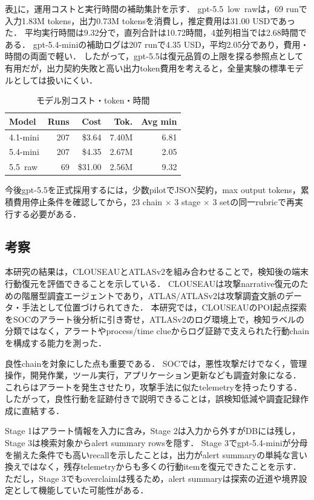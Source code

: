 \documentclass[dvipdfmx]{FITpaper}
\newcommand{\model}[1]{\mbox{\textrm{#1}}}
\begin{document}
表\ref{table:cost}に，運用コストと実行時間の補助集計を示す．
\model{gpt-5.5 low raw}は，69 runで入力1.83M tokens，出力0.73M tokensを消費し，推定費用は31.00 USDであった．
平均実行時間は9.32分で，直列合計は10.72時間，4並列相当では2.68時間である．
\model{gpt-5.4-mini}の補助ログは207 runで4.35 USD，平均2.05分であり，費用・時間の両面で軽い．
したがって，\model{gpt-5.5}は復元品質の上限を探る参照点として有用だが，出力契約失敗と高い出力token費用を考えると，全量実験の標準モデルとしては扱いにくい．

\begin{table}[ht]
    \centering
    \caption{モデル別コスト・token・時間}
    \label{table:cost}
    \begin{tabular}{lrrrr}
        \toprule
        Model & Runs & Cost & Tok. & Avg min \\
        \midrule
        \model{4.1-mini} & 207 & \$3.64 & 7.40M & 6.81 \\
        \model{5.4-mini} & 207 & \$4.35 & 2.67M & 2.05 \\
        \model{5.5 raw} & 69 & \$31.00 & 2.56M & 9.32 \\
        \bottomrule
    \end{tabular}
\end{table}

今後\model{gpt-5.5}を正式採用するには，少数pilotでJSON契約，max output tokens，累積費用停止条件を確認してから，23 chain $\times$ 3 stage $\times$ 3 setの同一rubricで再実行する必要がある．

\subsection{考察}

本研究の結果は，CLOUSEAUとATLASv2を組み合わせることで，検知後の端末行動復元を評価できることを示している．
CLOUSEAUは攻撃narrative復元のための階層型調査エージェントであり，ATLAS/ATLASv2は攻撃調査文脈のデータ・手法として位置づけられてきた．
本研究では，CLOUSEAUのPOI起点探索をSOCのアラート後分析に引き寄せ，ATLASv2のログ環境上で，検知ラベルの分類ではなく，アラートやprocess/time clueからログ証跡で支えられた行動chainを構成する能力を測った．

良性chainを対象にした点も重要である．
SOCでは，悪性攻撃だけでなく，管理操作，開発作業，ツール実行，アプリケーション更新なども調査対象になる．
これらはアラートを発生させたり，攻撃手法に似たtelemetryを持ったりする．
したがって，良性行動を証跡付きで説明できることは，誤検知低減や調査記録作成に直結する．

Stage 1はアラート情報を入力に含み，Stage 2は入力から外すがDBには残し，Stage 3は検索対象からalert summary rowsを隠す．
Stage 3で\model{gpt-5.4-mini}が分母を揃えた条件でも高いrecallを示したことは，出力がalert summaryの単純な言い換えではなく，残存telemetryからも多くの行動itemを復元できたことを示す．
ただし，Stage 3でもoverclaimは残るため，alert summaryは探索の近道や境界設定として機能していた可能性がある．
\end{document}
